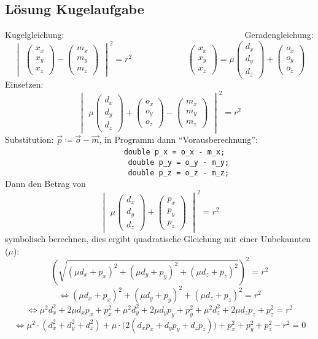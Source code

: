 \documentclass[paper=A4, pagesize, DIV=calc, smallheadings,
fontsize=11pt, expansion=false]{scrreprt}
\newcommand\colvec[1]{\begin{pmatrix}#1\end{pmatrix}}
\begin{document}
\subsection*{Lösung Kugelaufgabe}
Kugelgleichung:~~~~~~~~~~~~~~~~~~~~~~~~~~~~~~~~~~~~~~~~~~Geradengleichung:
\[
 \begin{vmatrix}\colvec{x_x\\x_y\\x_z} - \colvec{m_x\\m_y\\m_z} \end{vmatrix} ^2 = r^2 ~~~~~~~~~~~~~~~~~~~~~~~~~~~~~
 \colvec{x_x\\x_y\\x_z} = \mu \colvec{d_x\\d_y\\d_z} + \colvec{o_x\\o_y\\o_z}
\]
Einsetzen:
\[ \begin{vmatrix} \mu \colvec{d_x\\d_y\\d_z} + \colvec{o_x\\o_y\\o_z} - \colvec{m_x\\m_y\\m_z} \end{vmatrix} ^2 = r^2 \]
Substitution: $\vec{p} \coloneqq \vec{o} - \vec{m}$,
in Programm dann ``Vorausberechnung'':\\
~~~~~~~~~~~~~~~~~~~~~~~~~~~ \texttt{double p\_x = o\_x - m\_x;\\
~~~~~~~~~~~~~~~~~~~~~~~~~~~   double p\_y = o\_y - m\_y;\\
~~~~~~~~~~~~~~~~~~~~~~~~~~~   double p\_z = o\_z - m\_z;}
\\
Dann den Betrag von 
\[ \begin{vmatrix} \mu \colvec{d_x\\d_y\\d_z} + \colvec{p_x\\p_y\\p_z}\end{vmatrix} ^2 = r^2 \]
symbolisch berechnen, dies ergibt quadratische Gleichung mit einer Unbekannten ($\mu$):
\[ \left(\sqrt{(\mu d_x + p_x)^2 + (\mu d_y + p_y)^2 + (\mu d_z + p_z)^2}\right)^2 = r^2\]
\[ \Leftrightarrow (\mu d_x + p_x)^2 + (\mu d_y + p_y)^2 + (\mu d_z + p_z)^2 = r^2\]
\[ \Leftrightarrow \mu^2 d_x^2 + 2\mu d_xp_x  + p_x^2 + \mu^2 d_y^2 + 2\mu d_yp_y  + p_y^2 + \mu^2 d_z^2 + 2\mu d_zp_z  + p_z^2 = r^2\]
\[ \Leftrightarrow \mu^2 \cdot ( d_x^2 + d_y^2 + d_z^2) + \mu \cdot \big(2 (d_xp_x + d_yp_y +d_zp_z ) \big)  + p_x^2 +  p_y^2 +  p_z^2 -r^2 = 0 \] 
\end{document}
